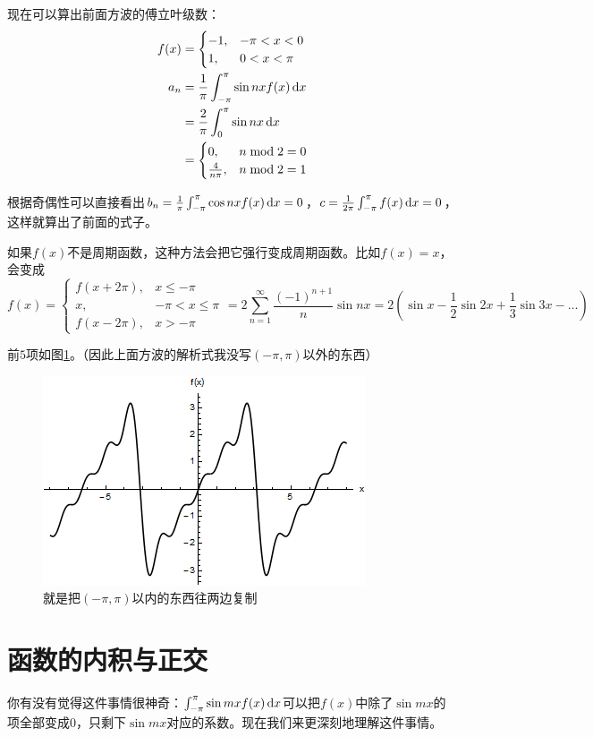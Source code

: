 现在可以算出前面方波的傅立叶级数：
\begin{align*}
f(x)&=\begin{cases} -1, &-\pi<x<0 \\ 1, &0<x<\pi \end{cases} \\
a_n&=\frac{1}{\pi} \int_{-\pi}^{\pi} \sin n x f(x) \mathop{}\!\mathrm{d} x \\
&=\frac{2}{\pi} \int_{0}^{\pi} \sin n x \mathop{}\!\mathrm{d} x \\
&=\begin{cases} 0, &n \bmod 2=0 \\ \frac{4}{n \pi}, &n \bmod 2=1 \end{cases}
\end{align*}

根据奇偶性可以直接看出$b_n=\frac{1}{\pi} \int_{-\pi}^{\pi} \cos n x f(x) \mathop{}\!\mathrm{d} x=0$，$c=\frac{1}{2 \pi} \int_{-\pi}^{\pi} f(x) \mathop{}\!\mathrm{d} x=0$，这样就算出了前面的式子。

如果$f(x)$不是周期函数，这种方法会把它强行变成周期函数。比如$f(x)=x$，会变成
\begin{equation*}
f(x)=\begin{cases} f(x+2 \pi), &x \le -\pi \\ x, &-\pi<x \le \pi \\ f(x-2 \pi), &x>-\pi \end{cases}=2 \sum_{n=1}^{\infty} \frac{(-1)^{n+1}}{n} \sin n x=2(\sin x-\frac{1}{2} \sin 2 x+\frac{1}{3} \sin 3 x-\dots)
\end{equation*}

前$5$项如图\ref{fig-trigo-x}。（因此上面方波的解析式我没写$(-\pi,\pi)$以外的东西）
\begin{figure}[htb]
\centering
\includegraphics[scale=0.5]{fig/trigo-x}
\caption{就是把$(-\pi,\pi)$以内的东西往两边复制}
\label{fig-trigo-x}
\end{figure}
\section{函数的内积与正交}
你有没有觉得这件事情很神奇：$\int_{-\pi}^{\pi} \sin m x f(x) \mathop{}\!\mathrm{d} x$可以把$f(x)$中除了$\sin m x$的项全部变成$0$，只剩下$\sin m x$对应的系数。现在我们来更深刻地理解这件事情。

